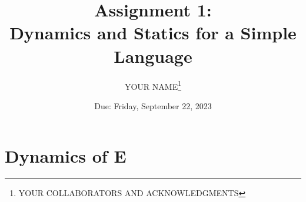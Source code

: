 \documentclass[11pt]{exam}
\title{Assignment 1: \\
       Dynamics and Statics for a Simple Language}
\date{Due: Friday, September 22, 2023}
\newcommand{\Lnumstr}{\textbf{\textsf{E}}}
\begin{document}
\author{YOUR NAME\thanks{YOUR COLLABORATORS AND ACKNOWLEDGMENTS}}
\maketitle

\begin{questions}
\question  

\question  

\question  

\question  

\question  

\question  

\end{questions}  

\clearpage
\appendix

\section{Dynamics of \Lnumstr}
\end{document}
